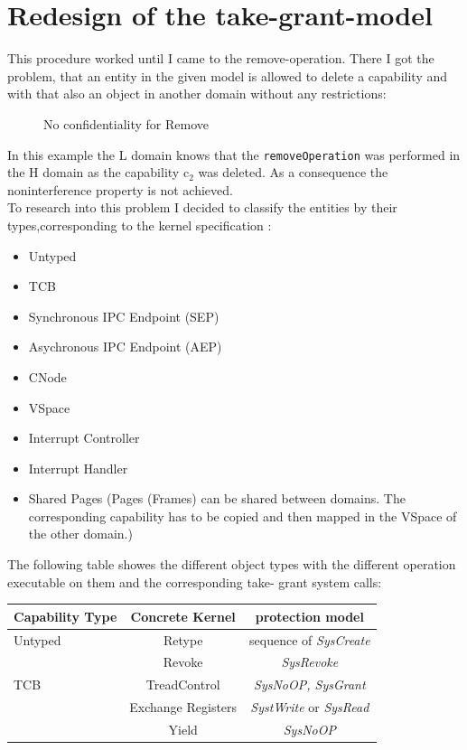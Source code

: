 \documentclass[11pt,a4paper,twoside]{article}
\begin{document}
{\section{Redesign of the take-grant-model}
This procedure worked until I came to the remove-operation. There I got the problem, that an entity in the given model is allowed to delete a capability and with that also an object in another domain without any restrictions:
\begin{figure}[H]
\caption{No confidentiality for Remove}
\end{figure}
In this example the L domain knows that the \texttt{removeOperation} was performed in the H domain as the capability c$_2$ was deleted. As a consequence the noninterference property is not achieved. \\
To research into this problem I decided to classify the entities by their types,corresponding to the kernel specification \cite{Manual}:
\begin{itemize}
\item Untyped 
\item TCB
\item Synchronous IPC Endpoint (SEP)
\item Asychronous IPC Endpoint (AEP)
\item CNode
\item VSpace
\item Interrupt Controller 
\item Interrupt Handler
\item Shared Pages (Pages (Frames) can be shared between domains. The corresponding capability has to be copied and then mapped in the VSpace of the other domain.)
\end{itemize}
The following table showes the different object types with the different operation executable on them and the corresponding take- grant system calls: 
\begin{table}[H]
\begin{tabular}{|l|c|c|}
\hline
Capability Type & Concrete Kernel & protection model \\
\hline
\hline
Untyped & Retype & sequence of \textit{SysCreate} \\
& Revoke & \textit{SysRevoke} \\
\hline
TCB & TreadControl & \textit{SysNoOP, SysGrant} \\
& Exchange Registers & \textit{SystWrite} or \textit{SysRead} \\
& Yield & \textit{SysNoOP} \\

\end{tabular}
\end{table}}
\end{document}
